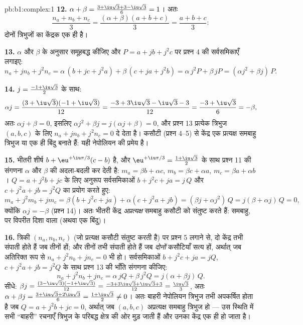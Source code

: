 \begin{solution}{pb:b1:complex:1}
\textbf{12.} $\alpha + \beta = \frac{3 + \iu\sqrt3 + 3 - \iu\sqrt3}6 = 1$।
अतः
\[
\frac{n_a + n_b + n_c}3
= \frac{(\alpha + \beta)(a + b + c)}3 = \frac{a + b + c}3 :
\]
दोनों त्रिभुजों का केंद्रक एक ही है।

\textbf{13.} $\alpha$ और $\beta$ के अनुसार समूहबद्ध कीजिए और $P = a + jb +
j^2c$ पर प्रश्न 4 की सर्वसमिकाएँ लगाइए:
\[
n_a + j n_b + j^2 n_c
= \alpha\,(b + jc + j^2 a) + \beta\,(c + ja + j^2 b)
= \alpha\,j^2 P + \beta\,j P
= (\alpha j^2 + \beta j)\,P .
\]

\textbf{14.} $j = \frac{-1 + \iu\sqrt3}2$ के साथ:
\[
\alpha j = \frac{(3 + \iu\sqrt3)(-1 + \iu\sqrt3)}{12}
= \frac{-3 + 3\iu\sqrt3 - \iu\sqrt3 - 3}{12}
= \frac{-3 + \iu\sqrt3}6 = -\beta ,
\]
अतः $\alpha j + \beta = 0$, इसलिए $\alpha j^2 + \beta j = j(\alpha j +
\beta) = 0$, और प्रश्न 13 प्रत्येक त्रिभुज $(a, b, c)$ के लिए $n_a + jn_b +
j^2n_c = 0$ दे देता है। कसौटी (प्रश्न 4--5) से केंद्र एक प्रत्यक्ष समबाहु
त्रिभुज या एक ही बिंदु बनाते हैं: यही नेपोलियन की प्रमेय है।

\textbf{15.} भीतरी शीर्ष $b + \eu^{+\iu\pi/3}(c - b)$ है, और
$\eu^{+\iu\pi/3} = \frac{1 + \iu\sqrt3}2$ के साथ प्रश्न 11 की संगणना
$\alpha$ और $\beta$ की अदला-बदली कर देती है: $m_a = \beta b + \alpha c$,
$m_b = \beta c + \alpha a$, $m_c = \beta a + \alpha b$। $Q = a + j^2b + jc$
के लिए अनुरूप सर्वसमिकाओं $b + j^2c + ja = j\,Q$ और $c + j^2a + jb = j^2 Q$
का प्रयोग करते हुए:
\[
m_a + j^2 m_b + j m_c
= \beta(b + j^2 c + ja) + \alpha(c + j^2 a + jb)
= (\beta j + \alpha j^2)\, Q = j(\beta + \alpha j)\,Q = 0 ,
\]
क्योंकि $\alpha j = -\beta$ (प्रश्न 14)। अतः भीतरी केंद्र \emph{अप्रत्यक्ष}
समबाहु कसौटी को संतुष्ट करते हैं: समबाहु, पर विपरीत दिशा वाला (अथवा एक
बिंदु)।

\textbf{16.} त्रिकी $(n_a, n_b, n_c)$ (जो प्रत्यक्ष कसौटी संतुष्ट करती है)
पर प्रश्न 5 लगाने से, दो केंद्र तभी संपाती होते हैं जब तीनों हों; और तीनों
तभी संपाती होते हैं जब \emph{दोनों} कसौटियाँ सत्य हों, अर्थात् जब अतिरिक्त
रूप से $n_a + j^2 n_b + j n_c = 0$ भी हो। सर्वसमिकाओं $b + j^2c + ja = jQ$,
$c + j^2a + jb = j^2Q$ के साथ प्रश्न 13 की भाँति संगणना कीजिए:
\[
n_a + j^2 n_b + j n_c
= \alpha\,jQ + \beta\,j^2 Q = j(\alpha + \beta j)\,Q .
\]
सीधे: $\beta j = \frac{(3 - \iu\sqrt3)(-1 + \iu\sqrt3)}{12} = \frac{-3 +
3\iu\sqrt3 + \iu\sqrt3 + 3}{12} = \frac{\iu\sqrt3}3$, अतः $\alpha + \beta j
= \frac{3 + \iu\sqrt3 + 2\iu\sqrt3}6 = \frac{1 + \iu\sqrt3}2 \neq 0$। अतः
बाहरी नेपोलियन त्रिभुज तभी अपकर्षित होता है जब $Q = a + j^2b + jc = 0$,
अर्थात् जब $(a, b, c)$ अप्रत्यक्ष समबाहु त्रिभुज हो --- उस स्थिति में सभी
``बाहरी'' रचनाएँ त्रिभुज के परिबद्ध क्षेत्र की ओर मुड़ जाती हैं और उनका
केंद्र एक ही हो जाता है।


\end{solution}
